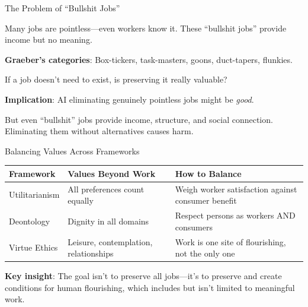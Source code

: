 ﻿\documentclass[aspectratio=169,11pt]{beamer}
\begin{document}
\begin{frame}{The Problem of ``Bullshit Jobs''}
\begin{conceptbox}
\small
Many jobs are pointless---even workers know it. These ``bullshit jobs'' provide income but no meaning.
\end{conceptbox}

\vspace{0.2em}
\textbf{Graeber's categories}: Box-tickers, task-masters, goons, duct-tapers, flunkies.

\vspace{0.2em}
If a job doesn't need to exist, is preserving it really valuable?

\vspace{0.2em}
\textbf{Implication}: AI eliminating genuinely pointless jobs might be \emph{good}.

\vspace{0.2em}
\begin{objectionbox}[Objection]
\small
But even ``bullshit'' jobs provide income, structure, and social connection. Eliminating them without alternatives causes harm.
\end{objectionbox}
\end{frame}

\begin{frame}{Balancing Values Across Frameworks}
\begin{table}[h]
\centering
\scriptsize
\begin{tabular}{@{}p{2.5cm}p{4.5cm}p{4.5cm}@{}}
\toprule
\textbf{Framework} & \textbf{Values Beyond Work} & \textbf{How to Balance} \\
\midrule
Utilitarianism & All preferences count equally & Weigh worker satisfaction against consumer benefit \\
\addlinespace
Deontology & Dignity in all domains & Respect persons as workers AND consumers \\
\addlinespace
Virtue Ethics & Leisure, contemplation, relationships & Work is one site of flourishing, not the only one \\
\bottomrule
\end{tabular}
\end{table}

\vspace{0.2em}
\textbf{Key insight}: The goal isn't to preserve all jobs---it's to preserve and create conditions for human flourishing, which includes but isn't limited to meaningful work.
\end{frame}
\end{document}
